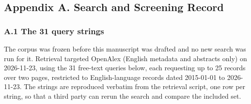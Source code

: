 \documentclass[11pt]{article}
\begin{document}
\subsection*{Appendix A. Search and Screening Record}
\subsubsection*{A.1 The 31 query strings}
The corpus was frozen before this manuscript was drafted and no new search was run for it. Retrieval targeted OpenAlex (English metadata and abstracts only) on 2026-11-23, using the 31 free-text queries below, each requesting up to 25 records over two pages, restricted to English-language records dated 2015-01-01 to 2026-11-23. The strings are reproduced verbatim from the retrieval script, one row per string, so that a third party can rerun the search and compare the included set.
\end{document}
